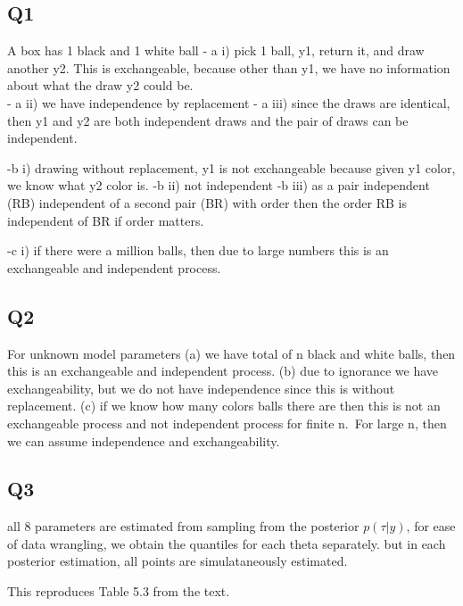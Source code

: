 \documentclass[
]{book}
\theoremstyle{definition}
\theoremstyle{definition}
\theoremstyle{definition}
\theoremstyle{definition}
\theoremstyle{remark}
\begin{document}
\hypertarget{q1}{%
\subsection*{Q1}\label{q1}}

A box has 1 black and 1 white ball
- a i) pick 1 ball, y1, return it, and draw another y2. This is exchangeable, because other than y1, we have no information about what the draw y2 could be.\\
- a ii) we have independence by replacement
- a iii) since the draws are identical, then y1 and y2 are both independent draws and the pair of draws can be independent.

-b i) drawing without replacement, y1 is not exchangeable because given y1 color, we know what y2 color is.
-b ii) not independent
-b iii) as a pair independent (RB) independent of a second pair (BR) with order then the order RB is independent of BR if order matters.

-c i) if there were a million balls, then due to large numbers this is an exchangeable and independent process.

\hypertarget{q2}{%
\subsection*{Q2}\label{q2}}

For unknown model parameters (a) we have total of n black and white balls, then this is an exchangeable and independent process. (b) due to ignorance we have exchangeability, but we do not have independence since this is without replacement. (c) if we know how many colors balls there are then this is not an exchangeable process and not independent process for finite n.~For large n, then we can assume independence and exchangeability.

\hypertarget{q3}{%
\subsection*{Q3}\label{q3}}

all 8 parameters are estimated from sampling from the posterior \(p(\tau | y)\), for ease of data wrangling, we obtain the quantiles for each theta separately. but in each posterior estimation, all points are simulataneously estimated.

This reproduces Table 5.3 from the text.
\end{document}
